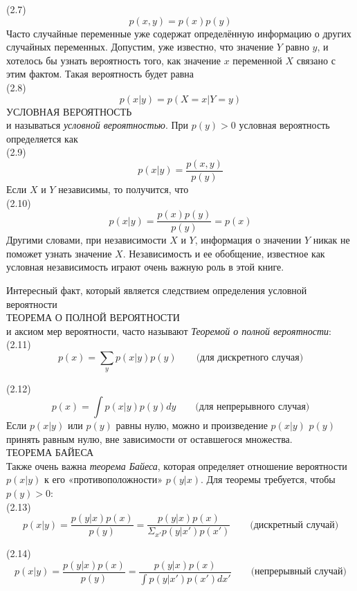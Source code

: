 \documentclass[10pt,a4paper]{article}
\begin{document}
 (2.7) $$p(x, y) = p(x) p(y)$$
 Часто случайные переменные уже содержат определённую информацию о других случайных переменных.
 Допустим, уже известно, что значение $Y$  равно $y$, и хотелось бы узнать вероятность того, как значение $x$  переменной $X$ связано с этим фактом. Такая вероятность будет равна\\

 (2.8) $$p(x | y) = p(X = x | Y = y)$$ 
 УСЛОВНАЯ ВЕРОЯТНОСТЬ\\
 и называться \textit{условной вероятностью}. При $p(y) > 0$ условная вероятность определяется как\\ 

 (2.9) $$p(x | y) = \frac{p(x,y)}{p(y)}$$
 Если $X$ и $Y$ независимы, то получится, что\\

 (2.10) $$p(x | y) = \frac{p(x)p(y)}{p(y)}=p(x)$$ 
 Другими словами, при независимости $X$ и $Y$, информация о значении $Y$ никак не поможет узнать значение $X$. Независимость и ее обобщение, известное как условная независимость играют очень важную роль в этой книге.
 
 Интересный факт, который является следствием определения условной вероятности\\ 
 ТЕОРЕМА О ПОЛНОЙ ВЕРОЯТНОСТИ\\
 и аксиом мер вероятности, часто называют \textit{Теоремой о полной вероятности}:\\
 
 (2.11) $$p(x)=\sum_y p(x | y) p(y) \qquad\mbox {(для дискретного случая)}$$
 
 (2.12) $$p(x)=\int p(x | y) p(y)dy \qquad\mbox {(для непрерывного случая)}$$
 Если $p(x | y)$ или $p(y)$ равны нулю, можно и произведение   $p(x | y)$ $p(y)$ принять равным нулю, вне зависимости от оставшегося множества.\\
 ТЕОРЕМА БАЙЕСА\\
 
 Также очень важна \textit{теорема Байеса}, которая определяет отношение вероятности $p(x | y)$ к его «противоположности» $p(y | x)$. Для теоремы требуется, чтобы $p(y) > 0$:\\

 (2.13) $$p(x | y)=\frac{p(y | x) p(x)}{p(y)}=\frac{p(y | x) p(x)}{\varSigma_{x'}p(y | x') p(x')}\qquad\mbox {(дискретный случай)}$$
 
 (2.14) $$p(x | y)=\frac{p(y | x) p(x)}{p(y)}=\frac{p(y | x) p(x)}{\int p(y | x') p(x')dx'}\qquad\mbox {(непрерывный случай)}$$
 
\end{document}
